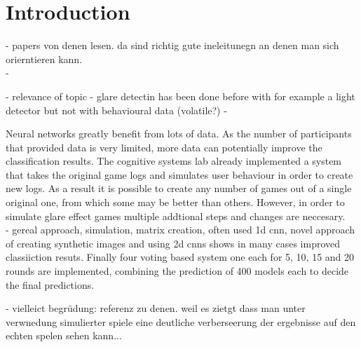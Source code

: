 \chapter{Introduction}
\label{introduction}



- papers von denen lesen. da sind richtig gute ineleitunegn an denen man sich orierntieren kann. \\
- 


- relevance of topic
- glare detectin has been done before with for example a light detector but not with behavioural data (volatile?) 
- 

Neural networks greatly benefit from lots of data. As the number of participants that provided data is very limited, more data can potentially improve the classification results.  The cognitive systems lab already implemented a system that takes the original game logs and simulates user behaviour in order to create new logs. As a result it is possible to create any number of games out of a single original one, from which some may be better than others. However, in order to simulate glare effect games multiple addtional steps and changes are neccesary. \\

- gereal approach, simulation, matrix creation, often used 1d cnn, novel approach of creating synthetic images and using 2d cnns shows in many cases improved classiiction resuts. 
Finally four voting based system one each for 5, 10, 15 and 20 rounds are implemented, combining the prediction of 400 models each to decide the final predictions.

- vielleict begrüdung: referenz zu denen. weil es zietgt dass man unter verwnedung simulierter spiele eine deutliche verberseerung der ergebnisse auf den echten spelen sehen kann...\\

